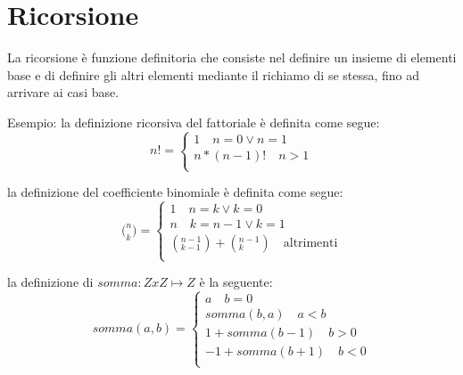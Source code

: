 \section{Ricorsione}
La ricorsione è funzione definitoria che consiste nel definire un insieme
di elementi base e di definire gli altri elementi mediante il richiamo di se stessa,
fino ad arrivare ai casi base.

Esempio:
la definizione ricorsiva del fattoriale è definita come segue:
\begin{equation*}
    n! = \begin{cases} 1 \quad n = 0 \lor n = 1 \\ n * (n-1)! \quad n > 1\\
\end{cases}
\end{equation*}

la definizione del coefficiente binomiale è definita come segue:
\begin{equation*}
    \bigl( ^ n _ k \bigr) = \begin{cases} 1 \quad n = k \lor k = 0 \\
                             n \quad k = n-1 \lor k = 1 \\
                             (^{n-1} _{k-1}) + (^{n-1} _k) \quad \text{altrimenti} \\
                \end{cases}
\end{equation*}

la definizione di $somma:Z x Z \mapsto Z$ è la seguente:
\begin{equation*}
    somma(a,b) = \begin{cases} a \quad b = 0 \\
                               somma(b,a) \quad a < b \\
                               1 + somma(b-1) \quad b > 0\\
                               -1 + somma(b+1) \quad b < 0 \\
                  \end{cases}
\end{equation*}
